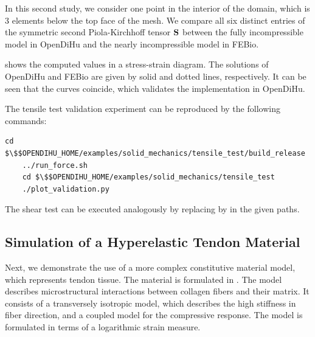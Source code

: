 In this second study, we consider one point in the interior of the domain, which is 3 elements below the top face of the mesh. We compare all six distinct entries of the symmetric second Piola-Kirchhoff tensor $\textbf{S}$ between the fully incompressible model in OpenDiHu and the nearly incompressible model in FEBio. 

 shows the computed values in a stress-strain diagram. The solutions of OpenDiHu and FEBio are given by solid and dotted lines, respectively. It can be seen that the curves coincide, which validates the implementation in OpenDiHu.

\begin{reproduce_no_break}
  The tensile test validation experiment can be reproduced by the following commands:
  \begin{lstlisting}[columns=fullflexible,breaklines=true,postbreak=\mbox{\textcolor{gray}{$\hookrightarrow$}\space}]
    cd $\$$OPENDIHU_HOME/examples/solid_mechanics/tensile_test/build_release
    ../run_force.sh
    cd $\$$OPENDIHU_HOME/examples/solid_mechanics/tensile_test
    ./plot_validation.py
  \end{lstlisting}
  The shear test can be executed analogously by replacing  by  in the given paths.
\end{reproduce_no_break}

\subsection{Simulation of a Hyperelastic Tendon Material}\label{sec:simulation_hyperelastic_tendon}

Next, we demonstrate the use of a more complex constitutive material model, which represents tendon tissue. The material is formulated in \cite{Carniel2017}. The model describes microstructural interactions between collagen fibers and their matrix. It consists of a transversely isotropic model, which describes the high stiffness in fiber direction, and a coupled model for the compressive response. The model is formulated in terms of a logarithmic strain measure.



